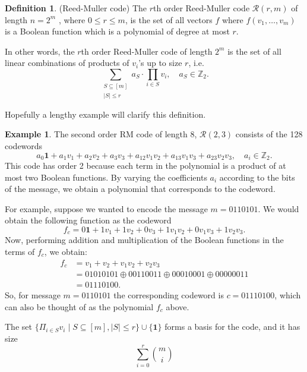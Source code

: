 \documentclass[12pt,twoside]{reedthesis}
\theoremstyle{definition}
\newtheorem{definition}[theorem]{Definition}
\newtheorem{example}[theorem]{Example}
\newcommand{\Z}{\mathbb{Z}}
\begin{document}
\begin{definition} (Reed-Muller code) The $r$th order Reed-Muller code $\mathscr{R}(r,m)$ of length $n = 2^m$ , where $0 \leq r \leq m$, is the set of all vectors $f$ where $f(v_1, \ldots, v_m)$ is a Boolean function which is a polynomial of degree at most $r$.
\end{definition}

In other words, the $r$th order Reed-Muller code of length $2^m$ is the set of all linear combinations of products of $v_i$'s up to size $r$, i.e.
\begin{equation} \label{reed_muller_poly}
\sum_{\substack{S \subseteq [m] \\ \lvert S \rvert \leq r}} a_S \cdot \prod_{i \in S} v_i,  \quad a_S \in \Z_2.
\end{equation}

Hopefully a lengthy example will clarify this definition.
\begin{example}
The second order RM code of length 8, $\mathscr{R}(2,3)$ consists of the 128 codewords
\begin{equation*} 
a_0\mathbf{1} + a_1v_1 + a_2v_2 + a_3v_3 + a_{12}v_1v_2 + a_{13}v_1v_3 + a_{23}v_2v_3, \quad a_i \in \Z_2. 
\end{equation*}
This code has order 2 because each term in the polynomial is a product of at most two Boolean functions. By varying the coefficients $a_i$ according to the bits of the message, we obtain a polynomial that corresponds to the codeword. 

For example, suppose we wanted to encode the message $m = 0110101$. We would obtain the following function as the codeword
\begin{equation*}
f_c = 0\mathbf{1} + 1v_1 + 1v_2 + 0v_3 + 1v_1v_2 + 0v_1v_3 + 1v_2v_3.
\end{equation*}
Now, performing addition and multiplication of the Boolean functions in the terms of $f_c$, we obtain: 
\begin{align*}
f_c 
& = v_1 + v_2 + v_1v_2 + v_2v_3 \\
& = 01010101 \oplus 00110011 \oplus 00010001 \oplus 00000011 \\
& = 01110100.
\end{align*}
So, for message $m = 0110101$ the corresponding codeword is $c=01110100$, which can also be thought of as the polynomial $f_c$ above.
\end{example}

The set $\{\Pi_{i \in S}v_i \mid S \subseteq [m], \lvert S \rvert \leq r\} \cup \{\mathbf{1}\}$ forms a basis for the code, and it has size
\begin{equation*}
\sum_{i=0}^{r} {m \choose i}
\end{equation*}
\end{document}
